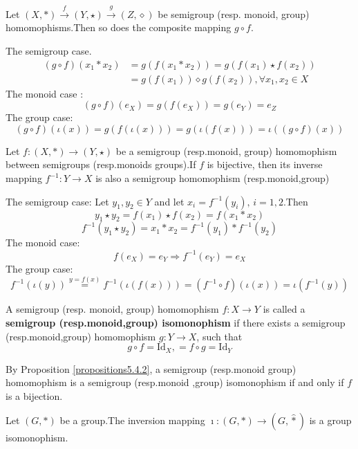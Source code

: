 \documentclass{book}
\numberwithin{equation}{section}
\begin{document}
\begin{propositionenv}\label{propositions5.4.2}
    Let $(X,*)\overset{f}{\rightarrow} (Y,\star)\overset{g}{\rightarrow}(Z,\diamond ) $ be semigroup (resp. monoid, group) homomophisms.Then so does the composite mapping $g\circ f$.
\end{propositionenv}
\begin{proofenv}
    The semigroup case.
        \begin{align*}
            (g\circ f)(x_1*x_2) & = g(f(x_1*x_2))  = g(f(x_1)\star f(x_2)) \\
            & = g(f(x_1))\diamond g(f(x_2)),\forall x_1,x_2\in X
        \end{align*}
    The monoid case :
    $$(g\circ f)(e_X)=g(f(e_X))=g(e_Y)=e_Z$$
    The group case:
    $$(g\circ f)(\iota(x))=g(f(\iota(x)))=g(\iota(f(x)))=\iota((g\circ f)(x))$$
\end{proofenv}
\begin{propositionenv}
    Let $f:(X,*)\rightarrow (Y,\star)$ be a semigroup (resp.monoid, group) homomophism between semigroups (resp.monoids groups).If $f$ is bijective, then its inverse mapping $f^{-1}:Y\rightarrow X$ is also a semigroup homomophism (resp.monoid,group) 
\end{propositionenv}
\begin{proofenv}
    The semigroup case: Let $y_1,y_2\in Y$ and let $x_i=f^{-1}(y_i),\,i=1,2$.Then 
    $$y_1\star y_2=f(x_1)\star f(x_2)=f(x_1*x_2)$$
    $$f^{-1}(y_1\star y_2)=x_1*x_2=f^{-1}(y_1)*f^{-1}(y_2)$$
    The monoid case:
    $$f(e_X)=e_Y\Rightarrow f^{-1}(e_Y)=e_X$$
    The group case:
    $$f^{-1}(\iota(y))\overset{y=f(x)}{=}f^{-1}(\iota(f(x)))=(f^{-1}\circ f)(\iota(x))=\iota(f^{-1}(y))$$
\end{proofenv}
\begin{definitionenv}
    A semigroup (resp. monoid, group) homomophism $f:X\rightarrow Y$ is called a \textbf{semigroup (resp.monoid,group) isomonophism} if there exists a semigroup (resp.monoid,group) homomophism $g:Y\rightarrow X$, such that 
    $$g\circ f=\mathrm{Id}_X,=f\circ g=\mathrm{Id}_Y$$
\end{definitionenv}
By Proposition \ref{propositions5.4.2}, a semigroup (resp.monoid group) homomophism is a semigroup (resp.monoid ,group) isomonophism if and only if $f$ is a bijection.
\begin{propositionenv}
    Let $(G,*)$ be a group.The inversion mapping $\imath :(G,*)\rightarrow(G,\hat{*})$ is a group isomonophism.
\end{propositionenv}
\end{document}
